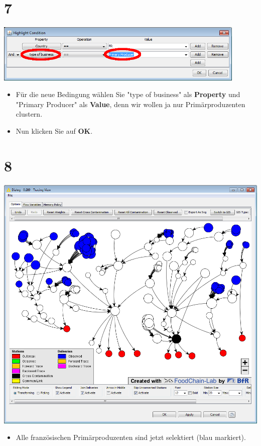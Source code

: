 \documentclass{beamer}
\begin{document}
\section{7}
\begin{frame}
	\begin{center}
  		\includegraphics[width=0.9\textwidth]{7.png}
	\end{center}
	\begin{itemize}
		\item Für die neue Bedingung wählen Sie "type of business" als \textbf{Property} und "Primary Producer" als \textbf{Value}, denn wir wollen ja nur Primärproduzenten clustern.
		\item Nun klicken Sie auf \textbf{OK}.
	\end{itemize}
\end{frame}

\section{8}
\begin{frame}
	\begin{center}
  		\includegraphics[height=0.6\textheight]{8.png}
	\end{center}
	\begin{itemize}
		\item Alle französischen Primärproduzenten sind jetzt selektiert (blau markiert).
	\end{itemize}
\end{frame}
\end{document}
